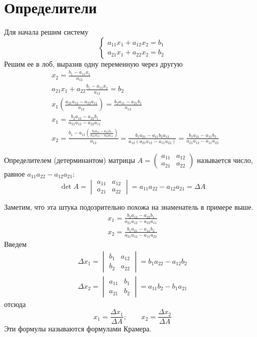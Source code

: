 \documentclass[12pt, a4paper]{article}
\begin{document}
    \section{Определители}
    Для начала решим систему \[
        \begin{cases}
            a_{11}x_{1} + a_{12}x_{2} = b_{1} \\
            a_{21}x_{1} + a_{22}x_{2} = b_{2}
        \end{cases}
    \]Решим ее в лоб, выразив одну переменную через другую
    \begin{align*}
        & x_{2} = \frac{b_{1} - a_{11}x_{1}}{a_{12}} \\
        & a_{21}x_{1} + a_{22} \frac{b_{1}-a_{11}x_{1}}{a_{12}} = b_{2} \\
        & x_{1} \left( \frac{a_{21} a_{12} - a_{22} a_{11}}{a_{12}} \right)  = \frac{b_{2} a_{11} - a_{21}b_{1}}{a_{12}} \\
        & x_{1} = \frac{b_{2}a_{12} - a_{22}b_{1}}{a_{21}a_{12} - a_{22}a_{11}} \\
        & x_{2}= \frac{b_{1} - a_{11}\left( \frac{b_{2} a_{11} - a_{21}b_{1}}{a_{21}a_{12 } -a_{22}a_{11}} \right) }{a_{12}} = \frac{b_{1}a_{21} -a_{11}b_{2}a_{12}}{a_{12}(a_{21}a_{12} - a_{11}a_{22})}= \frac{b_{1}a_{21} -a_{11}b_{2}}{a_{21}a_{12} - a_{11}a_{22}}
    \end{align*}
    \begin{definition}
        Определителем (детерминантом) матрицы \( A = \begin{pmatrix} a_{11} & a_{12} \\ a_{21} & a_{22} \end{pmatrix}  \) называется число, равное \( a_{11}a_{22} - a_{12}a_{21} \): \[
        \det A = \begin{vmatrix} a_{11} & a_{12} \\ a_{21} & a_{22} \end{vmatrix} = a_{11}a_{22} - a_{12}a_{21}= \Delta A
        \] 
    \end{definition}
    Заметим, что эта штука подозрительно похожа на знаменатель в примере выше.
    \begin{align*}
        x_{1} = \frac{b_{2}a_{12} - a_{22}b_{1}}{a_{21}a_{12} - a_{22}a_{11}} \\
        x_{2} = \frac{b_{1}a_{21} - a_{11}b_{2}}{a_{21}a_{12} - a_{11}a_{22}}
    \end{align*}
    Введем
    \begin{align*}
        \Delta x_{1} = \begin{vmatrix}
            b_{1} & a_{12} \\ b_{2} & a_{22}
        \end{vmatrix} = b_{1}a_{22} - a_{12}b_{2} \\
        \Delta x_{2} = \begin{vmatrix}
            a_{11} & b_{1} \\ a_{21} & b_{2}
        \end{vmatrix} = a_{11}b_{2} - b_{1}a_{21}
    \end{align*}отсюда \[
        x_{1} = \frac{\Delta x_{1}}{\Delta A}; \qquad x_{2} = \frac{\Delta x_{2}}{\Delta A}
    \]Эти формулы называются формулами Крамера. 
\end{document}
